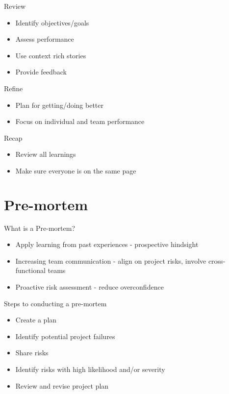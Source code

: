 \documentclass[aspectratio=169]{beamer}
\begin{document}
\begin{frame}{Review}
    \begin{itemize}
        \item Identify objectives/goals
        \item Assess performance
        \item Use context rich stories
        \item Provide feedback
    \end{itemize}
\end{frame}
\begin{frame}{Refine}
    \begin{itemize}
        \item Plan for getting/doing better
        \item Focus on individual and team performance
    \end{itemize}
\end{frame}
\begin{frame}{Recap}
    \begin{itemize}
        \item Review all learnings
        \item Make sure everyone is on the same page
    \end{itemize}
\end{frame}
\section{Pre-mortem}
\begin{frame}{What is a Pre-mortem?}
    \begin{itemize}[<+->]
        \item Apply learning from past experiences - prospective hindsight
        \item Increasing team communication - align on project risks, involve cross-functional teams
        \item Proactive risk assessment - reduce overconfidence
    \end{itemize}
\end{frame}
\begin{frame}{Steps to conducting a pre-mortem}
    \begin{itemize}[<+->]
        \item Create a plan
        \item Identify potential project failures
        \item Share risks
        \item Identify risks with high likelihood and/or severity
        \item Review and revise project plan
    \end{itemize}
\end{frame}
\end{document}
